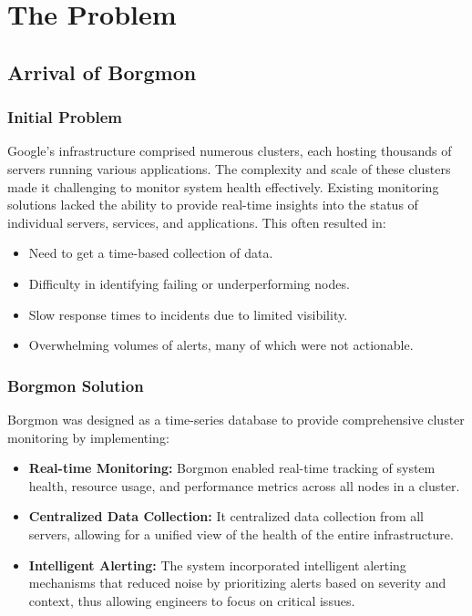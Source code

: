 


\section{The Problem}

\subsection{Arrival of Borgmon}

\subsubsection{Initial Problem}
Google's infrastructure comprised numerous clusters, each hosting thousands of servers running various applications. The complexity and scale of these clusters made it challenging to monitor system health effectively. Existing monitoring solutions lacked the ability to provide real-time insights into the status of individual servers, services, and applications. This often resulted in:
\begin{itemize}
    \item Need to get a time-based collection of data.
    \item Difficulty in identifying failing or underperforming nodes.
    \item Slow response times to incidents due to limited visibility.
    \item Overwhelming volumes of alerts, many of which were not actionable.
\end{itemize}

\subsubsection{Borgmon Solution\cite{Borgmon}}
Borgmon was designed as a time-series database to provide comprehensive cluster monitoring by implementing:
\begin{itemize}
    \item \textbf{Real-time Monitoring:} Borgmon enabled real-time tracking of system health, resource usage, and performance metrics across all nodes in a cluster.
    \item \textbf{Centralized Data Collection:} It centralized data collection from all servers, allowing for a unified view of the health of the entire infrastructure.
    \item \textbf{Intelligent Alerting:} The system incorporated intelligent alerting mechanisms that reduced noise by prioritizing alerts based on severity and context, thus allowing engineers to focus on critical issues.
\end{itemize}

